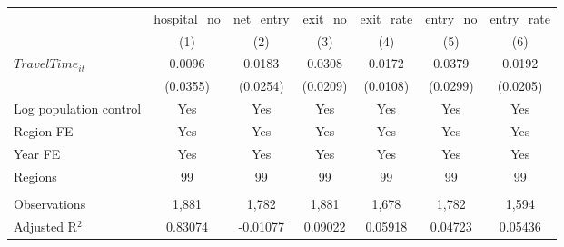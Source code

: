 \begingroup
\centering
\begin{tabular}{lcccccc}
   \toprule
                          & hospital\_no  & net\_entry  & exit\_no  & exit\_rate  & entry\_no  & entry\_rate \\    
                          & (1)           & (2)         & (3)       & (4)         & (5)        & (6)\\  
   \midrule 
   $TravelTime_{it}$      & 0.0096        & 0.0183      & 0.0308    & 0.0172      & 0.0379     & 0.0192\\   
                          & (0.0355)      & (0.0254)    & (0.0209)  & (0.0108)    & (0.0299)   & (0.0205)\\   
   Log population control & Yes           & Yes         & Yes       & Yes         & Yes        & Yes\\  
   Region FE              & Yes           & Yes         & Yes       & Yes         & Yes        & Yes\\  
   Year FE                & Yes           & Yes         & Yes       & Yes         & Yes        & Yes\\  
   Regions                & 99            & 99          & 99        & 99          & 99         & 99\\  
    \\
   Observations           & 1,881         & 1,782       & 1,881     & 1,678       & 1,782      & 1,594\\  
   Adjusted R$^2$         & 0.83074       & -0.01077    & 0.09022   & 0.05918     & 0.04723    & 0.05436\\  
   \bottomrule
\end{tabular}
\par\endgroup
